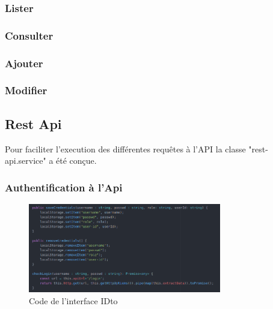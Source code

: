			\subsubsection{Lister}


			\subsubsection{Consulter}


			\subsubsection{Ajouter}


			\subsubsection{Modifier}


		\subsection{Rest Api}

			Pour faciliter l'execution des différentes requêtes à l'API la classe "rest-api.service" a été conçue.

			\subsubsection{Authentification à l'Api}

				\begin{figure}[H]
					\centering\includegraphics[width=0.75\textwidth, keepaspectratio]{res/ionic-rest-auth.png}
					\caption{Code de l'interface IDto}
				\end{figure}

